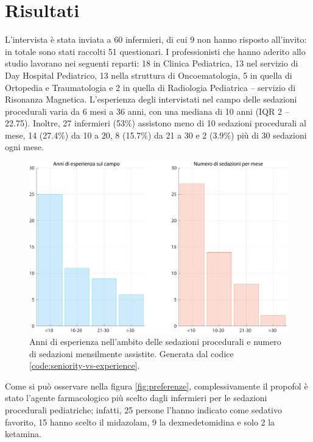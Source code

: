 \chapter{Risultati}

L'intervista è stata inviata a 60 infermieri, di cui 9 non hanno risposto all'invito: in totale sono stati raccolti 51 questionari. I professionisti che hanno aderito allo studio lavorano nei seguenti reparti: 18 in Clinica Pediatrica, 13 nel servizio di Day Hospital Pediatrico, 13 nella struttura di Oncoematologia, 5 in quella di Ortopedia e Traumatologia e 2 in quella di Radiologia Pediatrica -- servizio di Risonanza Magnetica. L'esperienza degli intervistati nel campo delle sedazioni procedurali varia da 6 mesi a 36 anni, con una mediana di 10 anni (IQR 2 -- 22.75). Inoltre, 27 infermieri (53$\%$) assistono meno di 10 sedazioni procedurali al mese, 14 (27.4$\%$) da 10 a 20, 8 (15.7$\%$) da 21 a 30 e 2 (3.9$\%$) più di 30 sedazioni ogni mese. 

\vfill

\begin{figure}[!ht]
    \centering
    \includegraphics[width=1\textwidth]{Figure/esperienzaVSfrequenza.pdf}
    \caption{Anni di esperienza nell'ambito delle sedazioni procedurali e numero di sedazioni mensilmente assistite. Generata dal codice \ref{code:seniority-vs-experience}.}
    \label{fig:esperienzavsfrequenza}
\end{figure}

\vfill

\newpage
Come si può osservare nella figura \ref{fig:preferenze}, complessivamente il propofol è stato l'agente farmacologico più scelto dagli infermieri per le sedazioni procedurali pediatriche; infatti, 25 persone l'hanno indicato come sedativo favorito, 15 hanno scelto il midazolam, 9 la dexmedetomidina e solo 2 la ketamina. 

